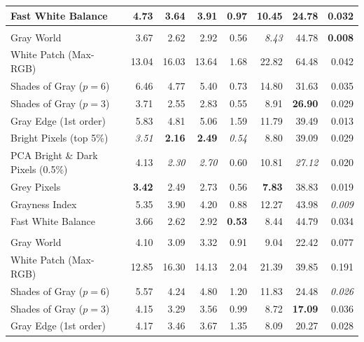 \begin{longtable}{@{}>{\raggedright\arraybackslash}p{6.8cm}rrrrrrr@{}}
Fast White Balance~\cite{fast_wb_greyness} & 4.73 & 3.64 & 3.91 & 0.97 & 10.45 & 24.78 & 0.032 \\
\midrule
\multicolumn{8}{@{}l}{\textbf{Cube++~\cite{ershov2020cube} ($N=4866$)}} \\
\midrule
Gray World~\cite{gray_world} & 3.67 & 2.62 & 2.92 & 0.56 & \textit{8.43} & 44.78 & \textbf{0.008} \\
White Patch (Max-RGB)~\cite{white_patch} & 13.04 & 16.03 & 13.64 & 1.68 & 22.82 & 64.48 & 0.042 \\
Shades of Gray ($p=6$)~\cite{shades_of_gray} & 6.46 & 4.77 & 5.40 & 0.73 & 14.80 & 31.63 & 0.035 \\
Shades of Gray ($p=3$)~\cite{shades_of_gray} & 3.71 & 2.55 & 2.83 & 0.55 & 8.91 & \textbf{26.90} & 0.029 \\
Gray Edge (1st order)~\cite{gray_edge} & 5.83 & 4.81 & 5.06 & 1.59 & 11.79 & 39.49 & 0.013 \\
Bright Pixels (top 5\%)~\cite{bright_pixels} & \textit{3.51} & \textbf{2.16} & \textbf{2.49} & \textit{0.54} & 8.80 & 39.09 & 0.029 \\
PCA Bright \& Dark Pixels (0.5\%)~\cite{cheng2014illuminant} & 4.13 & \textit{2.30} & \textit{2.70} & 0.60 & 10.81 & \textit{27.12} & 0.020 \\
Grey Pixels~\cite{yangGrayPixels} & \textbf{3.42} & 2.49 & 2.73 & 0.56 & \textbf{7.83} & 38.83 & 0.019 \\
Grayness Index~\cite{qianFindingGrayPixels} & 5.35 & 3.90 & 4.20 & 0.88 & 12.27 & 43.98 & \textit{0.009} \\
Fast White Balance~\cite{fast_wb_greyness} & 3.66 & 2.62 & 2.92 & \textbf{0.53} & 8.44 & 44.79 & 0.034 \\
\midrule
\multicolumn{8}{@{}l}{\textbf{NUS 8-Camera~\cite{cheng2014illuminant} ($N=1736$)}} \\
\midrule
Gray World~\cite{gray_world} & 4.10 & 3.09 & 3.32 & 0.91 & 9.04 & 22.42 & 0.077 \\
White Patch (Max-RGB)~\cite{white_patch} & 12.85 & 16.30 & 14.13 & 2.04 & 21.39 & 39.85 & 0.191 \\
Shades of Gray ($p=6$)~\cite{shades_of_gray} & 5.57 & 4.24 & 4.80 & 1.20 & 11.83 & 24.48 & \textit{0.026} \\
Shades of Gray ($p=3$)~\cite{shades_of_gray} & 4.15 & 3.29 & 3.56 & 0.99 & 8.72 & \textbf{17.09} & 0.036 \\
Gray Edge (1st order)~\cite{gray_edge} & 4.17 & 3.46 & 3.67 & 1.35 & 8.09 & 20.27 & 0.028 \\

\end{longtable}
